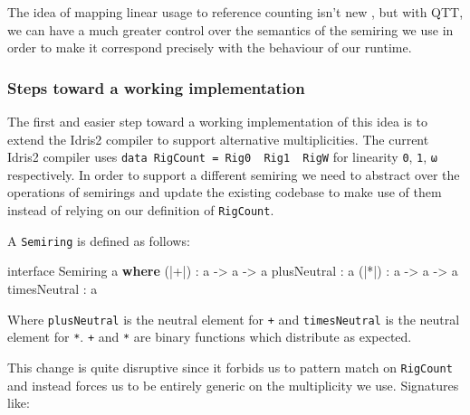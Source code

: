 \documentclass[
]{article}
\newenvironment{Shaded}{}{}
\newcommand{\DataTypeTok}[1]{\textcolor[rgb]{0.56,0.13,0.00}{#1}}
\newcommand{\KeywordTok}[1]{\textcolor[rgb]{0.00,0.44,0.13}{\textbf{#1}}}
\newcommand{\NormalTok}[1]{#1}
\newcommand{\OperatorTok}[1]{\textcolor[rgb]{0.40,0.40,0.40}{#1}}
\newcommand{\OtherTok}[1]{\textcolor[rgb]{0.00,0.44,0.13}{#1}}
\begin{document}
The idea of mapping linear usage to reference counting isn't new
\cite{linear_ref_count}, but with QTT, we can have a much greater
control over the semantics of the semiring we use in order to make it
correspond precisely with the behaviour of our runtime.

\hypertarget{steps-toward-a-working-implementation}{%
\subsubsection{Steps toward a working
implementation}\label{steps-toward-a-working-implementation}}

The first and easier step toward a working implementation of this idea
is to extend the Idris2 compiler to support alternative multiplicities.
The current Idris2 compiler uses
\texttt{data\ RigCount\ =\ Rig0\ \textbar{}\ Rig1\ \textbar{}\ RigW} for
linearity \texttt{0}, \texttt{1}, \texttt{ω} respectively. In order to
support a different semiring we need to abstract over the operations of
semirings and update the existing codebase to make use of them instead
of relying on our definition of \texttt{RigCount}.

A \texttt{Semiring} is defined as follows:

\begin{Shaded}
\begin{Highlighting}[]
\NormalTok{interface }\DataTypeTok{Semiring}\NormalTok{ a }\KeywordTok{where}
\NormalTok{  (}\OperatorTok{|+|}\NormalTok{) }\OperatorTok{:}\NormalTok{ a }\OtherTok{{-}\textgreater{}}\NormalTok{ a }\OtherTok{{-}\textgreater{}}\NormalTok{ a}
\NormalTok{  plusNeutral }\OperatorTok{:}\NormalTok{ a}
\NormalTok{  (}\OperatorTok{|*|}\NormalTok{) }\OperatorTok{:}\NormalTok{ a }\OtherTok{{-}\textgreater{}}\NormalTok{ a }\OtherTok{{-}\textgreater{}}\NormalTok{ a}
\NormalTok{  timesNeutral }\OperatorTok{:}\NormalTok{ a}
\end{Highlighting}
\end{Shaded}

Where \texttt{plusNeutral} is the neutral element for
\texttt{\textbar{}+\textbar{}} and \texttt{timesNeutral} is the neutral
element for \texttt{\textbar{}*\textbar{}}.
\texttt{\textbar{}+\textbar{}} and \texttt{\textbar{}*\textbar{}} are
binary functions which distribute as expected.

This change is quite disruptive since it forbids us to pattern match on
\texttt{RigCount} and instead forces us to be entirely generic on the
multiplicity we use. Signatures like:
\end{document}

